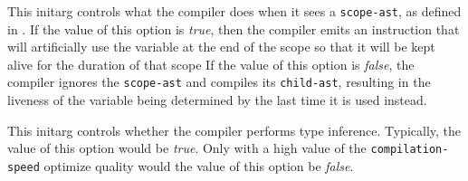 
This initarg controls what the compiler does when it sees a
\texttt{scope-ast}, as defined in .  If the
value of this option is \emph{true}, then the compiler emits
an instruction that will artificially use the variable at the end of
the scope so that it will be kept alive for the duration of that scope
If the value of this option is \emph{false}, the compiler ignores the
\texttt{scope-ast} and compiles its \texttt{child-ast}, resulting in
the liveness of the variable being determined by the last time it is
used instead.


This initarg controls whether the compiler performs type inference.
Typically, the value of this option would be \emph{true}.  Only with a
high value of the \texttt{compilation-speed} optimize quality would
the value of this option be \emph{false}.
